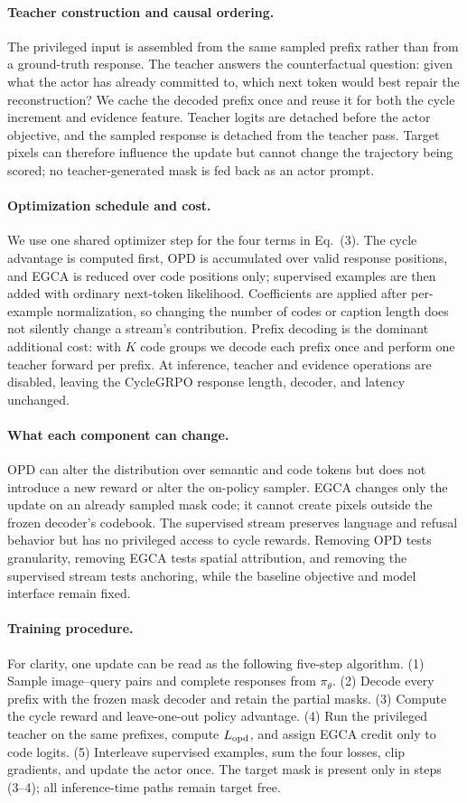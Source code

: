 \documentclass{article}
\begin{document}
\paragraph{Teacher construction and causal ordering.}The privileged input is assembled from the same sampled prefix rather than from a ground-truth response. The teacher answers the counterfactual question: given what the actor has already committed to, which next token would best repair the reconstruction? We cache the decoded prefix once and reuse it for both the cycle increment and evidence feature. Teacher logits are detached before the actor objective, and the sampled response is detached from the teacher pass. Target pixels can therefore influence the update but cannot change the trajectory being scored; no teacher-generated mask is fed back as an actor prompt.
\paragraph{Optimization schedule and cost.}We use one shared optimizer step for the four terms in Eq.~(3). The cycle advantage is computed first, OPD is accumulated over valid response positions, and EGCA is reduced over code positions only; supervised examples are then added with ordinary next-token likelihood. Coefficients are applied after per-example normalization, so changing the number of codes or caption length does not silently change a stream's contribution. Prefix decoding is the dominant additional cost: with $K$ code groups we decode each prefix once and perform one teacher forward per prefix. At inference, teacher and evidence operations are disabled, leaving the CycleGRPO response length, decoder, and latency unchanged.
\paragraph{What each component can change.}OPD can alter the distribution over semantic and code tokens but does not introduce a new reward or alter the on-policy sampler. EGCA changes only the update on an already sampled mask code; it cannot create pixels outside the frozen decoder's codebook. The supervised stream preserves language and refusal behavior but has no privileged access to cycle rewards. Removing OPD tests granularity, removing EGCA tests spatial attribution, and removing the supervised stream tests anchoring, while the baseline objective and model interface remain fixed.
\paragraph{Training procedure.}For clarity, one update can be read as the following five-step algorithm. (1) Sample image--query pairs and complete responses from $\pi_\theta$. (2) Decode every prefix with the frozen mask decoder and retain the partial masks. (3) Compute the cycle reward and leave-one-out policy advantage. (4) Run the privileged teacher on the same prefixes, compute $L_{\rm opd}$, and assign EGCA credit only to code logits. (5) Interleave supervised examples, sum the four losses, clip gradients, and update the actor once. The target mask is present only in steps (3--4); all inference-time paths remain target free.
\end{document}
